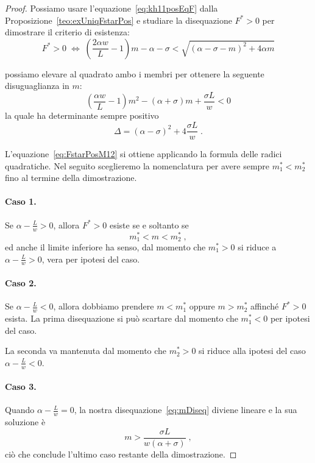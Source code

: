 \begin{proof}
Possiamo usare l'equazione~\eqref{eq:kh11posEqF} dalla Proposizione~\ref{teo:exUniqFstarPos} e studiare
la disequazione $F^* >0$ per dimostrare il criterio di esistenza:
$$F^* > 0 \; \iff \;
\left( \frac{2 \alpha w}{L} -1 \right) m - \alpha - \sigma < \sqrt{ {(\alpha - \sigma -m)}^2 + 4 \alpha m }$$

possiamo elevare al quadrato ambo i membri per ottenere la seguente disuguaglianza in $m$:
\begin{equation}
    \left( \frac{\alpha w}{L} -1 \right) m^2 -( \alpha + \sigma) m + \frac{\sigma L}{w} < 0
    \label{eq:mDiseq}
\end{equation}
la quale ha determinante sempre positivo
$$\Delta = {(\alpha -\sigma)}^2 +4 \frac{\sigma L}{w} \; .$$

L'equazione~\eqref{eq:FstarPosM12} si ottiene applicando la formula delle radici quadratiche.
Nel seguito sceglieremo la nomenclatura per avere sempre $m_1^* < m_2^*$ fino al termine della dimostrazione.

\paragraph{Caso 1.}
Se $\alpha - \frac{L}{w} >0$, allora $F^*>0$ esiste se e soltanto se
$$m_1^* < m < m_2^* \; ,$$
ed anche il limite inferiore ha senso, dal momento che
$m_1^* > 0$ si riduce a $\alpha - \frac{L}{w}>0$, vera per ipotesi del caso.

\paragraph{Caso 2.}
Se $\alpha -\frac{L}{w} <0$, allora dobbiamo prendere $m < m_1^*$ oppure $m > m_2^*$ affinché $F^* >0$ esista.
La prima disequazione si può scartare dal momento che $m_1^* <0$ per ipotesi del caso.

La seconda va mantenuta dal momento che $m_2^* >0$ si riduce alla ipotesi del caso $\alpha - \frac{L}{w} < 0$.

\paragraph{Caso 3.}
Quando $\alpha - \frac{L}{w} =0$, la nostra disequazione~\eqref{eq:mDiseq} diviene lineare e la sua soluzione è
$$m > \frac{\sigma L}{w (\alpha +\sigma)} \; ,$$
ciò che conclude l'ultimo caso restante della dimostrazione.
\end{proof}


